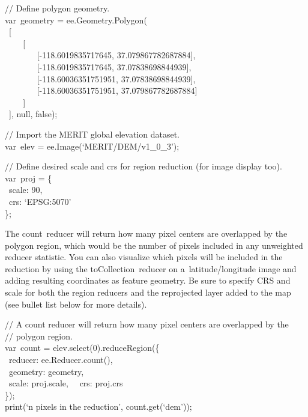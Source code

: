 \documentclass[
  letterpaper,
  DIV=11,
  numbers=noendperiod]{scrreprt}
\begin{document}
// Define polygon geometry.\\
var~geometry = ee.Geometry.Polygon(\\
\hspace*{0.333em} ~{[}\\
\hspace*{0.333em} ~ ~ ~{[}\\
\hspace*{0.333em} ~ ~ ~ ~ ~{[}-118.6019835717645,
37.079867782687884{]},\\
\hspace*{0.333em} ~ ~ ~ ~ ~{[}-118.6019835717645,
37.07838698844939{]},\\
\hspace*{0.333em} ~ ~ ~ ~ ~{[}-118.60036351751951,
37.07838698844939{]},\\
\hspace*{0.333em} ~ ~ ~ ~ ~{[}-118.60036351751951,
37.079867782687884{]}\\
\hspace*{0.333em} ~ ~ ~{]}\\
\hspace*{0.333em} ~{]}, null, false);

// Import the MERIT global elevation dataset.\\
var~elev = ee.Image(`MERIT/DEM/v1\_0\_3');

// Define desired scale and crs for region reduction (for image display
too).\\
var~proj = \{\\
\hspace*{0.333em} ~scale: 90,\\
\hspace*{0.333em} ~crs: `EPSG:5070'\\
\};

The count~reducer will return how many pixel centers are overlapped by
the polygon region, which would be the number of pixels included in any
unweighted reducer statistic. You can also visualize which pixels will
be included in the reduction by using the toCollection~reducer on
a~latitude/longitude image and adding resulting coordinates as feature
geometry. Be sure to specify CRS and scale for both the region reducers
and the reprojected layer added to the map (see bullet list below for
more details).

// A count reducer will return how many pixel centers are overlapped by
the\\
// polygon region.\\
var~count = elev.select(0).reduceRegion(\{\\
\hspace*{0.333em} ~reducer: ee.Reducer.count(),\\
\hspace*{0.333em} ~geometry: geometry,\\
\hspace*{0.333em} ~scale: proj.scale,~ ~crs: proj.crs\\
\});\\
print(`n pixels in the reduction', count.get(`dem'));
\end{document}
